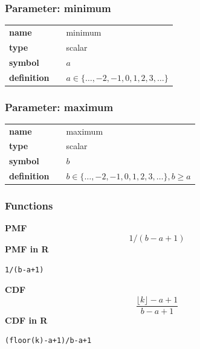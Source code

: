 \subsubsection*{Parameter: minimum}

\noindent\begin{tabular}{p{2cm}cl}
\textbf{name} & & minimum \\
\textbf{type} & & scalar \\
\textbf{symbol} & & $a$  \\
\textbf{definition} & & $a \in \{\dots,-2,-1,0,1,2,3,\dots\}$
\end{tabular}
\subsubsection*{Parameter: maximum}

\noindent\begin{tabular}{p{2cm}cl}
\textbf{name} & & maximum \\
\textbf{type} & & scalar \\
\textbf{symbol} & & $b$  \\
\textbf{definition} & & $b \in \{\dots,-2,-1,0,1,2,3,\dots\}, b \ge a$
\end{tabular}
%
\subsubsection*{Functions}

\smallskip \noindent \hspace{.2cm} \textbf{PMF} 
\begin{equation*}1/(b-a+1)\end{equation*}
\smallskip \noindent \hspace{.2cm} \textbf{PMF in R}  
\begin{verbatim}1/(b-a+1)\end{verbatim}
\smallskip \noindent \hspace{.2cm} \textbf{CDF} 
\begin{equation*}\frac{\lfloor k \rfloor -a+1}{b-a+1}\end{equation*}
\smallskip \noindent \hspace{.2cm} \textbf{CDF in R} 
\begin{verbatim}(floor(k)-a+1)/b-a+1\end{verbatim}
\smallskip
